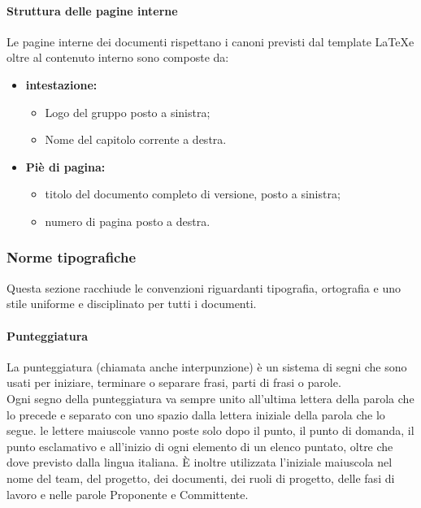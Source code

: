 \paragraph{Struttura delle pagine interne}
Le pagine interne dei documenti rispettano i canoni previsti dal template \LaTeX e oltre al contenuto interno sono composte da: \\

\begin{itemize}
	\item \textbf{intestazione:}
	\begin{itemize}
		\item Logo del gruppo posto a sinistra;
		\item Nome del capitolo corrente a destra. 
	\end{itemize}
	\item \textbf {Piè di pagina:}
	\begin{itemize}
	\item titolo del documento completo di versione, posto a sinistra;
	\item numero di pagina posto a destra.
	\end{itemize}

\end{itemize} 
\subsubsection{Norme tipografiche}
Questa sezione racchiude le convenzioni riguardanti tipografia, ortografia e uno stile uniforme e disciplinato per tutti i documenti.
\paragraph{Punteggiatura}
La punteggiatura (chiamata anche interpunzione) è un sistema di segni che sono usati per iniziare, terminare o separare frasi, parti di frasi o parole. \\
Ogni segno della punteggiatura va sempre unito all'ultima lettera della parola che lo precede e separato con uno spazio dalla lettera iniziale della parola che lo segue.
le lettere maiuscole vanno poste solo dopo il punto, il punto di domanda, il punto esclamativo e all’inizio di ogni elemento di un elenco puntato, oltre che dove previsto dalla lingua italiana. È inoltre utilizzata l’iniziale maiuscola nel nome del team, del progetto, dei documenti, dei ruoli di progetto, delle fasi di
lavoro e nelle parole Proponente e Committente.
